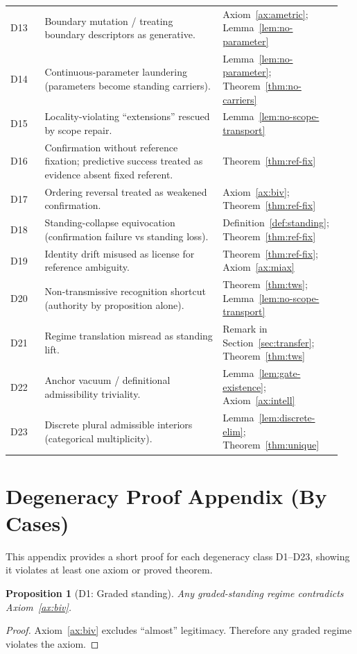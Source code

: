 \documentclass[12pt]{article}
\newtheorem{proposition}{Proposition}
\begin{document}
\begin{longtable}{>{\raggedright\arraybackslash}p{0.10\linewidth} >{\raggedright\arraybackslash}p{0.52\linewidth} >{\raggedright\arraybackslash}p{0.33\linewidth}}
D13 & Boundary mutation / treating boundary descriptors as generative. & Axiom~\ref{ax:ametric}; Lemma~\ref{lem:no-parameter} \\
D14 & Continuous-parameter laundering (parameters become standing carriers). & Lemma~\ref{lem:no-parameter}; Theorem~\ref{thm:no-carriers} \\
D15 & Locality-violating ``extensions'' rescued by scope repair. & Lemma~\ref{lem:no-scope-transport} \\
D16 & Confirmation without reference fixation; predictive success treated as evidence absent fixed referent. & Theorem~\ref{thm:ref-fix} \\
D17 & Ordering reversal treated as weakened confirmation. & Axiom~\ref{ax:biv}; Theorem~\ref{thm:ref-fix} \\
D18 & Standing-collapse equivocation (confirmation failure vs standing loss). & Definition~\ref{def:standing}; Theorem~\ref{thm:ref-fix} \\
D19 & Identity drift misused as license for reference ambiguity. & Theorem~\ref{thm:ref-fix}; Axiom~\ref{ax:miax} \\
D20 & Non-transmissive recognition shortcut (authority by proposition alone). & Theorem~\ref{thm:tws}; Lemma~\ref{lem:no-scope-transport} \\
D21 & Regime translation misread as standing lift. & Remark in Section~\ref{sec:transfer}; Theorem~\ref{thm:tws} \\
D22 & Anchor vacuum / definitional admissibility triviality. & Lemma~\ref{lem:gate-existence}; Axiom~\ref{ax:intell} \\
D23 & Discrete plural admissible interiors (categorical multiplicity). & Lemma~\ref{lem:discrete-elim}; Theorem~\ref{thm:unique} \\
\bottomrule
\end{longtable}

\appendix
\section{Degeneracy Proof Appendix (By Cases)}
\label{app:deg}

This appendix provides a short proof for each degeneracy class D1--D23, showing it violates at least one axiom or proved theorem.

\begin{proposition}[D1: Graded standing]
Any graded-standing regime contradicts Axiom~\ref{ax:biv}.
\end{proposition}
\begin{proof}
Axiom~\ref{ax:biv} excludes ``almost'' legitimacy. Therefore any graded regime violates the axiom. \end{proof}
\end{document}
